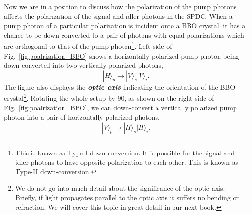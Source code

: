 Now we are in a position to discuss how the polarization of the pump photons affects the polarization of the signal and idler photons in the SPDC.
When a pump photon of a particular polarization is incident onto a BBO crystal, it has a chance to be down-converted to a pair of photons with equal polarizations which are orthogonal to that of the pump photon\footnote{This is known as Type-I down-conversion. It is possible for the signal and idler photons to have opposite polarization to each other. This is known as Type-II down-conversion.}.
Left side of Fig.~\ref{fig:poalrization_BBO} shows a horizontally polarized pump photon being down-converted into two vertically polarized photons,
\begin{equation}
    |H\rangle_p \rightarrow |V\rangle_s|V\rangle_i.
\end{equation}
The figure also displays the \textbf{\emph{optic axis}} indicating the orientation of the BBO crystal\footnote{We do not go into much detail about the significance of the optic axis. Briefly, if light propagates parallel to the optic axis it suffers no bending or refraction. We will cover this topic in great detail in our next book.}.
Rotating the whole setup by 90\degree, as shown on the right side of Fig.~\ref{fig:poalrization_BBO}, we can down-convert a vertically polarized pump photon into a pair of horizontally polarized photons,
\begin{equation}
    |V\rangle_p \rightarrow |H\rangle_s|H\rangle_i.
\end{equation}

